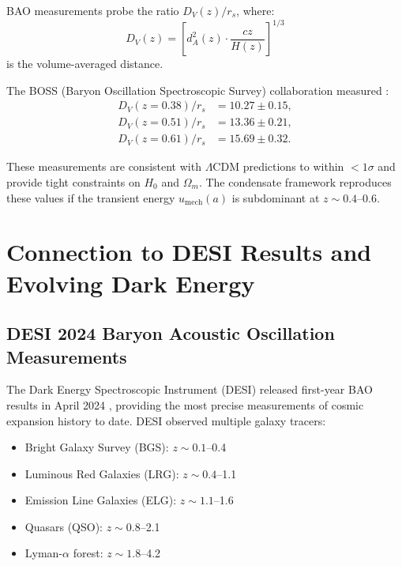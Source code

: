 \documentclass[11pt,a4paper]{article}
\newcommand{\umech}{\ensuremath{u_{\mathrm{mech}}}}
\newcommand{\OmegaM}{\ensuremath{\Omega_m}}
\theoremstyle{definition}
\theoremstyle{remark}
\begin{document}
BAO measurements probe the ratio $D_V(z)/r_s$, where:
\begin{equation}
D_V(z) = \left[d_A^2(z) \cdot \frac{cz}{H(z)}\right]^{1/3}
\end{equation}
is the volume-averaged distance.

The BOSS (Baryon Oscillation Spectroscopic Survey) collaboration measured \cite{Alam2017}:
\begin{align}
D_V(z=0.38)/r_s &= 10.27 \pm 0.15, \\
D_V(z=0.51)/r_s &= 13.36 \pm 0.21, \\
D_V(z=0.61)/r_s &= 15.69 \pm 0.32.
\end{align}

These measurements are consistent with $\Lambda$CDM predictions to within $< 1\sigma$ and provide tight constraints on $H_0$ and $\OmegaM$. The condensate framework reproduces these values if the transient energy $\umech(a)$ is subdominant at $z \sim 0.4$--0.6.

\section{Connection to DESI Results and Evolving Dark Energy}
\label{sec:desi}

\subsection{DESI 2024 Baryon Acoustic Oscillation Measurements}
\label{sec:desi_results}

The Dark Energy Spectroscopic Instrument (DESI) released first-year BAO results in April 2024 \cite{DESI2024}, providing the most precise measurements of cosmic expansion history to date. DESI observed multiple galaxy tracers:
\begin{itemize}[leftmargin=*, itemsep=0.2em]
\item Bright Galaxy Survey (BGS): $z \sim 0.1$--0.4
\item Luminous Red Galaxies (LRG): $z \sim 0.4$--1.1
\item Emission Line Galaxies (ELG): $z \sim 1.1$--1.6
\item Quasars (QSO): $z \sim 0.8$--2.1
\item Lyman-$\alpha$ forest: $z \sim 1.8$--4.2
\end{itemize}
\end{document}
